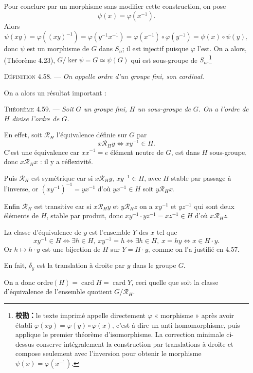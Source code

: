 Pour conclure par un morphisme sans modifier cette construction, on pose
\[
\psi(x)=\varphi(x^{-1}).
\]
Alors
\[
\psi(xy)=\varphi((xy)^{-1})=\varphi(y^{-1}x^{-1})
=\varphi(x^{-1})\circ\varphi(y^{-1})=\psi(x)\circ\psi(y),
\]
donc $\psi$ est un morphisme de $G$ dans $S_n$; il est injectif puisque $\varphi$ l'est. On a alors, (Théorème 4.23), $G/\ker\psi=G\simeq\psi(G)$ qui est sous-groupe de $S_n$.\footnote{\textbf{校勘：}le texte imprimé appelle directement $\varphi$ « morphisme » après avoir établi $\varphi(xy)=\varphi(y)\circ\varphi(x)$, c'est-à-dire un anti-homomorphisme, puis applique le premier théorème d'isomorphisme. La correction minimale ci-dessus conserve intégralement la construction par translations à droite et compose seulement avec l'inversion pour obtenir le morphisme $\psi(x)=\varphi(x^{-1})$.}
\bookend

\medskip\noindent\textsc{Définition 4.58.} --- \emph{On appelle ordre d'un groupe fini, son cardinal.}

On a alors un résultat important :

\medskip\noindent\textsc{Théorème 4.59.} --- \emph{Soit $G$ un groupe fini, $H$ un sous-groupe de $G$. On a l'ordre de $H$ divise l'ordre de $G$.}

En effet, soit $\mathcal R_H$ l'équivalence définie sur $G$ par
\[
x\mathcal R_H y\Longleftrightarrow xy^{-1}\in H.
\]
C'est une équivalence car $xx^{-1}=e$ élément neutre de $G$, est dans $H$ sous-groupe, donc $x\mathcal R_H x$ : il y a réflexivité.

Puis $\mathcal R_H$ est symétrique car si $x\mathcal R_H y$, $xy^{-1}\in H$, avec $H$ stable par passage à l'inverse, or $(xy^{-1})^{-1}=yx^{-1}$ d'où $yx^{-1}\in H$ soit $y\mathcal R_H x$.

Enfin $\mathcal R_H$ est transitive car si $x\mathcal R_H y$ et $y\mathcal R_H z$ on a $xy^{-1}$ et $yz^{-1}$ qui sont deux éléments de $H$, stable par produit, donc $xy^{-1}\cdot yz^{-1}=xz^{-1}\in H$ d'où $x\mathcal R_H z$.

La classe d'équivalence de $y$ est l'ensemble $Y$ des $x$ tel que
\[
xy^{-1}\in H\Longleftrightarrow \exists h\in H,\ xy^{-1}=h
\Longleftrightarrow \exists h\in H,\ x=hy
\Longleftrightarrow x\in H\cdot y.
\]
Or $h\mapsto h\cdot y$ est une bijection de $H$ sur $Y=H\cdot y$, comme on l'a justifié en 4.57.

En fait, $\delta_y$ est la translation à droite par $y$ dans le groupe $G$.

On a donc ordre$(H)=\operatorname{card}H=\operatorname{card}Y$, ceci quelle que soit la classe d'équivalence de l'ensemble quotient $G/\mathcal R_H$.

